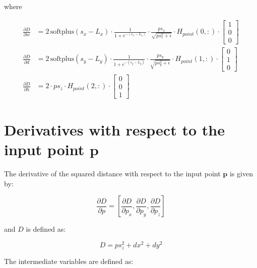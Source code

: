 \documentclass[11pt]{article}
\begin{document}
        where

        \begin{equation}
            \begin{aligned}
                \frac{\partial D}{\partial w} &= 2\,\text{softplus}(s_x - L_x) \cdot \frac{1}{1 + e^{-(s_x - L_x)}} \cdot \frac{ps_{x}}{\sqrt{ps_{x}^2 + \epsilon}} \cdot H_{point}(0,:) \cdot \begin{bmatrix} 1 \\ 0 \\ 0 \end{bmatrix}\\
                \frac{\partial D}{\partial d} &= 2\,\text{softplus}(s_y - L_y) \cdot \frac{1}{1 + e^{-(s_y - L_y)}} \cdot \frac{ps_{y}}{\sqrt{ps_{y}^2 + \epsilon}} \cdot H_{point}(1,:) \cdot \begin{bmatrix} 0 \\ 1 \\ 0 \end{bmatrix}\\
                \frac{\partial D}{\partial h} &= 2 \cdot ps_z \cdot H_{point}(2,:) \cdot \begin{bmatrix} 0 \\ 0 \\ 1 \end{bmatrix}
            \end{aligned}
        \end{equation}

    \section*{Derivatives with respect to the input point \(\mathbf{p}\)}

        The derivative of the squared distance with respect to the input point \(\mathbf{p}\) is given by:

        \begin{equation}
            \frac{\partial D}{\partial p} = \left[\frac{\partial D}{\partial p_{x}}, \frac{\partial D}{\partial p_{y}}, \frac{\partial D}{\partial p_{z}}\right]
        \end{equation}

        and $D$ is defined as:

        \begin{equation}
            D = ps_{z}^2 + dx^2 + dy^2
        \end{equation}

        The intermediate variables are defined as:
\end{document}
